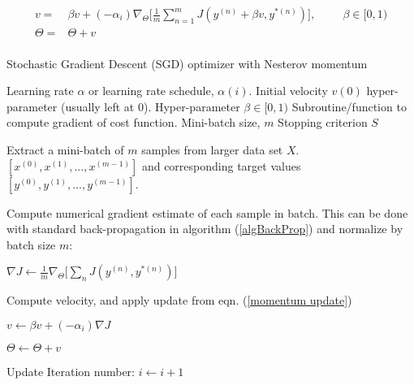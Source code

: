 \documentclass[12pt,letterpaper]{article}
\begin{document}
\begin{equation}
\label{Nesterov update}
\begin{split}
v =&  \beta v + (-\alpha_i)\nabla_{\Theta} \Big[ \frac{1}{m} \sum_{n=1}^{m} J(y^{(n)}+\beta v,y^{*(n)}) \Big] ,
\hspace{1cm} \beta \in [0,1) \\
\Theta =&  \Theta + v
\end{split} 
\end{equation}

\paragraph*{}

\begin{algorithm}
\caption{Stochastic Gradient Descent (SGD) optimizer with Nesterov momentum}
\label{algSGD}

\begin{algorithmic}

\REQUIRE Learning rate $\alpha$ or learning rate schedule, $\alpha(i)$.
\REQUIRE Initial velocity $v(0)$ hyper-parameter (usually left at $0$).
\REQUIRE Hyper-parameter $\beta \in [0,1)$
\REQUIRE Subroutine/function to compute gradient of cost function.
\REQUIRE Mini-batch size, $m$
\REQUIRE Stopping criterion $S$

	\item Extract a mini-batch of $m$ samples from larger data set $X$. $[x^{(0)},x^{(1)},...,x^{(m-1)}]$ and corresponding target values 
	$[y^{(0)},y^{(1)},...,y^{(m-1)}]$.
	\item Compute numerical gradient estimate of each sample in batch. This can be done with standard back-propagation in algorithm (\ref{algBackProp}) and 			 	normalize by batch size $m$:
	\item $\nabla J \leftarrow \frac{1}{m}\nabla_{\Theta} \Big[ \sum_n J(y^{(n)},y^{*(n)}) \Big] $
	\item Compute velocity, and apply update from eqn. (\ref{momentum update})
	\item $v \leftarrow \beta v + (-\alpha_i)\nabla J$
	\item $\Theta \leftarrow \Theta + v$
	\item Update Iteration number: $i \leftarrow i + 1$
\ENDWHILE

\end{algorithmic}
\end{algorithm}

\end{document}
